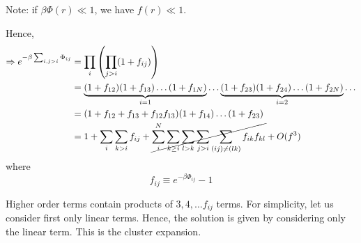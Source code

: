 \documentclass[../main/main.tex]{subfiles}
\begin{document}
\begin{remark}
Note: if \( \beta \Phi (r) \ll 1 \), we have \( f(r) \ll 1 \).
\end{remark}
Hence,
\begin{equation}
\begin{split}
  \Rightarrow e^{-\beta \sum_{i,j>i}^{} \Phi _{ij}  } &= \prod_{i}^{} \qty(\prod_{j>i}^{} (1+ f_{ij})  ) \\
  & = \underbrace{(1+f_{12})(1+f_{13})  \dots ( 1 + f_{1N })}_{i=1}   \dots \underbrace{(1+f_{23}) (1+ f_{24}) \dots ( 1 + f_{2N })}_{i=2} \dots \\
  & = (1 + f_{12} + f_{13} + f_{12}f_{13}) (1+f_{14}) \dots(1+f_{23}) \\
  & = 1 + \sum_{i}^{} \sum_{k>i}^{} f_{ij} + \cancel{\sum_{i}^{N} \sum_{k \ge i}^{} \sum_{l > k}^{} \sum_{j > i }^{} \sum_{(ij) \neq (lk)}^{}  f_{ik} f_{kl}       } + O (f^3)
\end{split}
\end{equation}
where 
\begin{equation}
  f_{ij} \equiv  e^{-\beta \Phi _{ij}} -1
\end{equation}

Higher order terms contain products of \( 3,4,\dots f_{ij} \) terms. For simplicity, let us consider first only linear terms. Hence, the solution is given by considering only the linear term. This is the cluster expansion.
\end{document}
